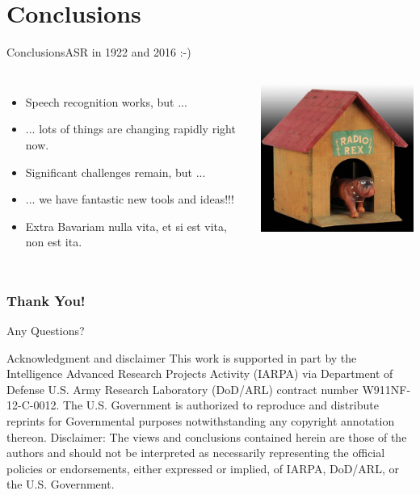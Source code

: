 \documentclass[12pt,xcolor=dvipsnames]{beamer}
\begin{document}
\section{Conclusions}
\begin{frame}{Conclusions}{ASR in 1922 and 2016 :-)}
  \begin{columns}[c]
    \column{48mm}
    \begin{itemize}
    \item Speech recognition works, but ...
    \item ... lots of things are changing rapidly right now.
    \item Significant challenges remain, but ...
    \item ... we have fantastic new tools and ideas!!!
    \item Extra Bavariam nulla vita, et si est vita, non est ita.
    \end{itemize}
    \column{60mm}
    \includegraphics[width=60mm]{figures/Rex}
  \end{columns}
\end{frame}



\begin{frame}
  \frametitle{Thank You!}
  \begin{center}
    {\color{Maroon}\Huge Any Questions?}
  \end{center}
\end{frame}


\begin{frame}{Acknowledgment and disclaimer}{}
  This work is supported in part by the Intelligence Advanced Research
  Projects Activity (IARPA) via Department of Defense U.S. Army
  Research Laboratory (DoD/ARL) contract number W911NF-12-C-0012. The
  U.S. Government is authorized to reproduce and distribute reprints
  for Governmental purposes notwithstanding any copyright annotation
  thereon.
  \vfill
  Disclaimer: The views and conclusions contained herein are
  those of the authors and should not be interpreted as necessarily
  representing the official policies or endorsements, either expressed
  or implied, of IARPA, DoD/ARL, or the U.S. Government.
\end{frame}
\end{document}
